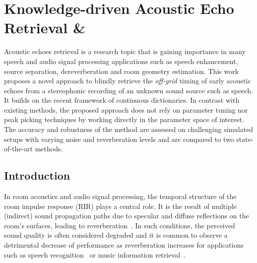 \chapter{Knowledge-driven Acoustic Echo Retrieval \& \blaster}\label{ch:blaster}

 Acoustic echoes retrieval is a research topic that is gaining importance in many speech and audio signal processing applications
such as speech enhancement, source separation, dereverberation and room geometry estimation.
This work proposes a novel approach to blindly retrieve the \textit{off-grid} timing of early acoustic echoes %
from a stereophonic recording of an unknown sound source such as speech. It builds on the recent framework of continuous dictionaries.
In contrast with existing methods, the proposed approach does not rely on parameter tuning nor peak picking techniques by working directly in the parameter space of interest.
The accuracy and robustness of the method are assessed on challenging simulated setups with varying noise and reverberation levels and are compared to two state-of-the-art methods.

\section{Introduction}
\label{sec:blaster:intro}
In room acoustics and audio signal processing, the temporal structure of the room impulse response (RIR) plays a central role.
It is the result of multiple (indirect) sound propagation paths due to specular and diffuse reflections on the room's surfaces, leading to reverberation~\cite{Wang2011}.
In such conditions, the perceived sound quality is often considered degraded and it is common to observe a detrimental decrease of performance as reverberation increases for applications such as speech recognition~\cite{Yoshoka2012} or music information retrieval~\cite{Barthet2010}.

